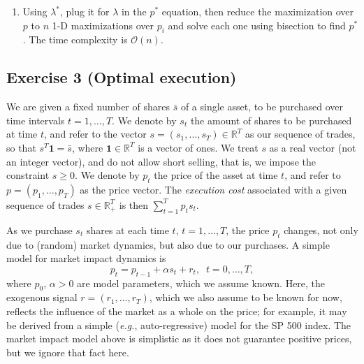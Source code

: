 \documentclass[11pt]{article}
\begin{document}
\begin{solution}
\begin{enumerate}
\item Using $\lambda^*$, plug it for $\lambda$ in the $p^*$ equation, then reduce the maximization over $p$ to $n$ 1-D maximizations over $p_i$ and solve each one using bisection to find $p^*$. The time complexity is $\mathcal{O}(n)$.
\end{enumerate}
\end{solution}

\newpage
\subsection*{Exercise 3 (Optimal execution)}

We are given a fixed number of shares $\bar{s}$ of a single asset, to be purchased over time intervals $t=1,\ldots,T$.  We denote by $s_t$ the amount of shares to be purchased at time $t$, and refer to
the vector $s=(s_1,\ldots,s_T) \in \mathbb{R}^{T}$ as our sequence of trades, so that $s^T \mathbf{1} = \bar{s}$, where $\mathbf{1} \in \mathbb{R}^{T}$ is a vector of ones.  We treat $s$ as a real vector (not an integer vector), and do not allow short selling, that is, we impose the constraint $s \ge 0$. We denote by $p_t$ the price of the asset at time $t$, and refer to $p = (p_1,\ldots,p_T)$ as the price vector.  The {\em execution cost} associated with a given sequence of trades $s \in \mathbb{R}_{+}^{T}$ is then $\sum_{t=1}^T  p_t s_t$.

As we purchase $s_t$ shares at each time $t$, $t=1,\ldots,T$, the price $p_t$ changes, not only due to (random) market dynamics, but also due to our purchases. A simple model for market impact dynamics is
\begin{equation}\label{eq:price-dyn}
p_t = p_{t-1} + \alpha s_t + r_t, \;\; t=0,\ldots,T,
\end{equation}
where $p_0$, $\alpha>0$ are model parameters, which we assume known. Here, the exogenous signal $r = (r_1,\ldots,r_T)$, which we also assume to be known for now, reflects the influence of the market as a whole on the price; for example, it may be derived from a simple ({\em e.\/g.}, auto-regressive) model for the SP 500 index. The market impact model above is simplistic as it does not guarantee positive prices, but we ignore that fact here.
\end{document}

